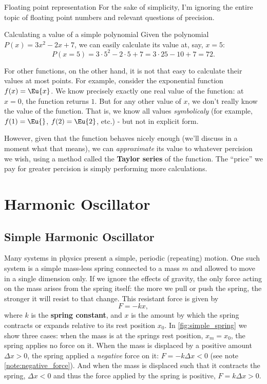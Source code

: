 \begin{note}{Floating point representation}{}
  For the sake of simplicity, I'm ignoring the entire topic of floating point numbers and relevant questions of precision.
\end{note}

\begin{example}{Calculating a value of a simple polynomial}{}
  Given the polynomial $P(x)=3x^{2}-2x+7$, we can easily calculate its value at, say, $x=5$:
  \[
    P(x=5) = 3\cdot5^{2}-2\cdot5+7 = 3\cdot25-10+7 = 72.
  \]
\end{example}

For other functions, on the other hand, it is not that easy to calculate their values at most points. For example, consider the exponential function $f(x)=\Eu{x}$. We know precisely exactly one real value of the function: at $x=0$, the function returns $1$. But for any other value of $x$, we don't really know the value of the function. That is, we know all values \textit{symbolicaly} (for example, $f(1)=\Eu{}$, $f(2)=\Eu{2}$, etc.) - but not in explicit form.

However, given that the function behaves nicely enough (we'll discuss in a moment what that means), we can \textit{approximate} its value to whatever percision we wish, using a method called the \textbf{Taylor series} of the function. The \enquote{price} we pay for greater percision is simply performing more calculations.

\section{Harmonic Oscillator}
\subsection{Simple Harmonic Oscillator}
Many systems in physics present a simple, periodic (repeating) motion. One such system is a simple mass-less spring connected to a mass $m$ and allowed to move in a single dimension only. If we ignore the effects of gravity, the only force acting on the mass arises from the spring itself: the more we pull or push the spring, the stronger it will resist to that change. This resistant force is given by
\begin{equation}
  F = -kx,
  \label{eq:spring_force}
\end{equation}
where $k$ is the \textbf{spring constant}, and $x$ is the amount by which the spring contracts or expands relative to its rest position $x_{0}$. In \autoref{fig:simple_spring} we show three cases: when the mass is at the springs rest position, $x_{m}=x_{0}$, the spring applies no force on it. When the mass is displaced by a positive amount $\Delta x>0$, the spring applied a \textit{negative} force on it: $F=-k\Delta x<0$ (see note \autoref{note:negative_force}). And when the mass is displaced such that it contracts the spring, $\Delta x<0$ and thus the force applied by the spring is positive, $F=k\Delta x>0$.

